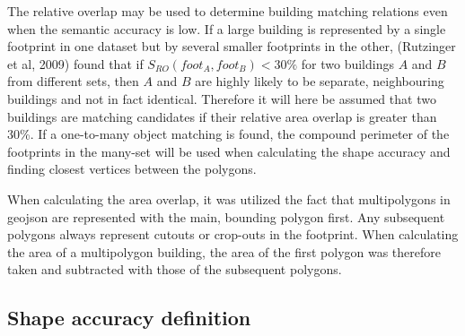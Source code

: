 \documentclass[a4paper]{article}
\begin{document}
The relative overlap may be used to determine building matching relations even when the semantic accuracy is low.
If a large building is represented by a single footprint in one dataset but by several smaller footprints in the other, (Rutzinger et al, 2009) found that if $S_{RO}(foot_{A}, foot_{B}) < 30\%$ for two buildings $A$ and $B$ from different sets, then $A$ and $B$ are highly likely to be separate, neighbouring buildings and not in fact identical.
Therefore it will here be assumed that two buildings are matching candidates if their relative area overlap is greater than 30\%.
If a one-to-many object matching is found, the compound perimeter of the footprints in the many-set will be used when calculating the shape accuracy and finding closest vertices between the polygons.

When calculating the area overlap, it was utilized the fact that multipolygons in geojson are represented with the main, bounding polygon first.
Any subsequent polygons always represent cutouts or crop-outs in the footprint.
When calculating the area of a multipolygon building, the area of the first polygon was therefore taken and subtracted with those of the subsequent polygons.

\subsection{Shape accuracy definition}
\end{document}
